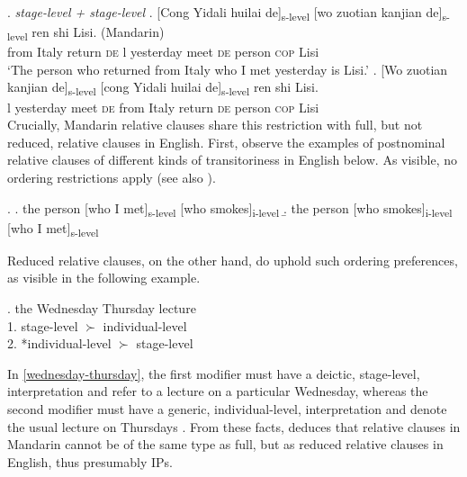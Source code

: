 \documentclass [output=book,colorlinks,citecolor=brown]{langscibook}
\begin{document}
\ex. \label{ex3} \emph{stage-level + stage-level} \label{s-s}
\ag. [Cong Yidali huilai de]\textsubscript{s-level} [wo zuotian kanjian de]\textsubscript{s-level} ren shi Lisi. (Mandarin)\\
from Italy return \textsc{de} l yesterday meet \textsc{de} person \textsc{cop} Lisi\\
`The person who returned from Italy who I met yesterday is Lisi.'
\bg. [Wo zuotian kanjian de]\textsubscript{s-level} [cong Yidali huilai de]\textsubscript{s-level} ren shi Lisi.\\
l yesterday meet \textsc{de} from Italy return \textsc{de} person \textsc{cop} Lisi\\

Crucially, Mandarin relative clauses share this restriction with full, but not reduced, relative clauses in English. First, observe the examples of postnominal relative clauses of different kinds of transitoriness in English below. As visible, no ordering restrictions apply (see also \citealt{baker:2003:verbal}). %


\ex. \a. the person [who I met]\textsubscript{s-level} [who smokes]\textsubscript{i-level}
\b. the person [who smokes]\textsubscript{i-level} [who I met]\textsubscript{s-level} \\ \null \hfill \citep[239]{cinque:2020:relcl}

Reduced relative clauses, on the other hand, do uphold such ordering preferences, as visible in the following example. %

\ex. the Wednesday Thursday lecture\\
1. stage-level $\succ$ individual-level\\
2. *individual-level $\succ$ stage-level \null \hfill \citep[112]{larson:2004:order} \label{wednesday-thursday}

In \ref{wednesday-thursday}, the first modifier must have a deictic, stage-level, interpretation and refer to a lecture on a particular Wednesday, whereas the second modifier must have a generic, individual-level, interpretation and denote the usual lecture on Thursdays \citep[239]{cinque:2020:relcl}. From these facts, \citet{cinque:2020:relcl} deduces that relative clauses in Mandarin cannot be of the same type as full, but as reduced relative clauses in English, thus presumably IPs.
\end{document}
